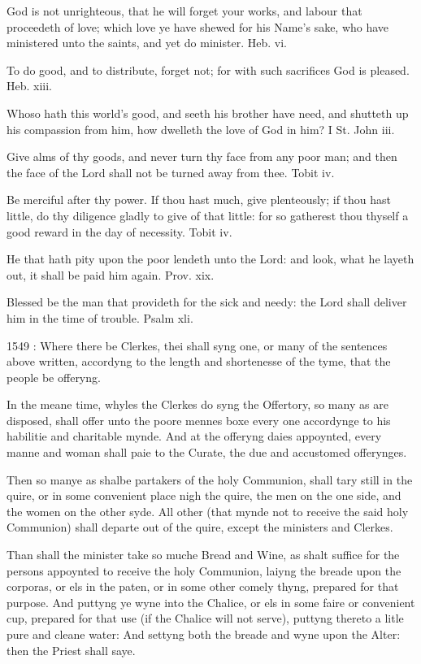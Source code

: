 God is not unrighteous, that he will forget your works, and labour that proceedeth of love; which love ye have shewed for his Name's sake, who have ministered unto the saints, and yet do minister. Heb. vi.

To do good, and to distribute, forget not; for with such sacrifices God is pleased. Heb. xiii.

Whoso hath this world's good, and seeth his brother have need, and shutteth up his compassion from him, how dwelleth the love of God in him? I St. John iii.

Give alms of thy goods, and never turn thy face from any poor man; and then the face of the Lord shall not be turned away from thee. Tobit iv.

Be merciful after thy power. If thou hast much, give plenteously; if thou hast little, do thy diligence gladly to give of that little: for so gatherest thou thyself a good reward in the day of necessity. Tobit iv.

He that hath pity upon the poor lendeth unto the Lord: and look, what he layeth out, it shall be paid him again. Prov. xix.

Blessed be the man that provideth for the sick and needy: the Lord shall deliver him in the time of trouble. Psalm xli.

1549 : 
Where there be Clerkes, thei shall syng one, or many of the sentences above written, accordyng to the length and shortenesse of the tyme, that the people be offeryng.

In the meane time, whyles the Clerkes do syng the Offertory, so many as are disposed, shall offer unto the poore mennes boxe every one accordynge to his habilitie and charitable mynde. And at the offeryng daies appoynted, every manne and woman shall paie to the Curate, the due and accustomed offerynges.

Then so manye as shalbe partakers of the holy Communion, shall tary still in the quire, or in some convenient place nigh the quire, the men on the one side, and the women on the other syde. All other (that mynde not to receive the said holy Communion) shall departe out of the quire, except the ministers and Clerkes.

Than shall the minister take so muche Bread and Wine, as shalt suffice for the persons appoynted to receive the holy Communion, laiyng the breade upon the corporas, or els in the paten, or in some other comely thyng, prepared for that purpose. And puttyng ye wyne into the Chalice, or els in some faire or convenient cup, prepared for that use (if the Chalice will not serve), puttyng thereto a litle pure and cleane water: And settyng both the breade and wyne upon the Alter: then the Priest shall saye.


